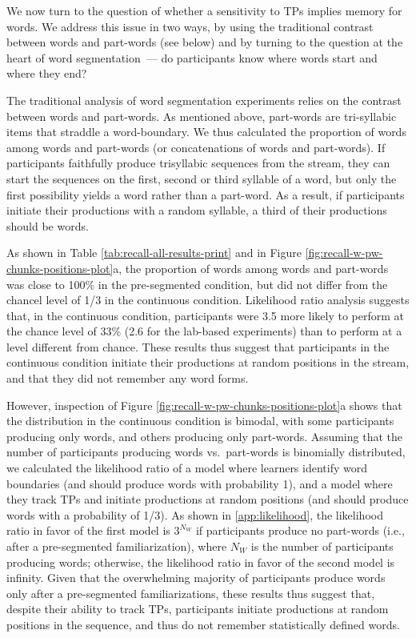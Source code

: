 \documentclass[]{article}
\begin{document}
We now turn to the question of whether a sensitivity to TPs implies memory for words. We address this issue in two ways, by using the traditional contrast between words and part-words (see below) and by turning to the question at the heart of word segmentation~--- do participants know where words start and where they end? 

The traditional analysis of word segmentation experiments relies on the contrast between words and part-words. As mentioned above, part-words are tri-syllabic items that straddle a word-boundary. We thus calculated the proportion of words among words and part-words (or concatenations of words and part-words). If participants faithfully produce trisyllabic sequences from the stream, they can start the sequences on the first, second or third syllable of a word, but only the first possibility yields a word rather than a part-word. As a result, if participants initiate their productions with a random syllable, a third of their productions should be words.

As shown in Table \ref{tab:recall-all-results-print} and in Figure \ref{fig:recall-w-pw-chunks-positions-plot}a, the proportion of words among words and part-words was close to 100\% in the pre-segmented condition, but did not differ from the chancel level of 1/3 in the continuous condition. Likelihood ratio analysis suggests that, in the continuous condition, participants were 3.5 more likely to perform at the chance level of 33\% (2.6 for the lab-based experiments) than to perform at a level different from chance. These results thus suggest that participants in the continuous condition initiate their productions at random positions in the stream, and that they did not remember any word forms.

However, inspection of Figure \ref{fig:recall-w-pw-chunks-positions-plot}a shows that the distribution in the continuous condition is bimodal, with some participants producing only words, and others producing only part-words. Assuming that the number of participants producing words vs.~part-words is binomially distributed, we calculated the likelihood ratio of a model where learners identify word boundaries (and should produce words with probability 1), and a model where they track TPs and initiate productions at random positions (and should produce words with a probability of 1/3). As shown in \ref{app:likelihood}, the likelihood ratio in favor of the first model is \(3^{N_W}\) if participants produce no part-words (i.e., after a pre-segmented familiarization), where \(N_W\) is the number of participants producing words; otherwise, the likelihood ratio in favor of the second model is infinity. Given that the overwhelming majority of participants produce words only after a pre-segmented familiarizations, these results thus suggest that, despite their ability to track TPs, participants initiate productions at random positions in the sequence, and thus do not remember statistically defined words.
\end{document}
